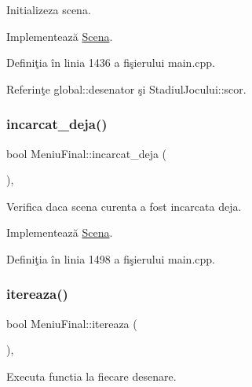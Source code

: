 Initializeza scena. 

Implementează \hyperlink{classScena_a6f53a1dcef68084361dc8f9d56bbb8c0}{Scena}.



Definiţia în linia 1436 a fişierului main.\+cpp.



Referinţe global\+::desenator şi Stadiul\+Jocului\+::scor.

\mbox{\label{classMeniuFinal_a72edd47d4783b321124d7d7af74b9ef8}} 
\subsubsection{\texorpdfstring{incarcat\+\_\+deja()}{incarcat\_deja()}}
{\footnotesize\ttfamily bool Meniu\+Final\+::incarcat\+\_\+deja (\begin{DoxyParamCaption}{ }\end{DoxyParamCaption})\hspace{0.3cm}{\ttfamily [override]}, {\ttfamily [virtual]}}

Verifica daca scena curenta a fost incarcata deja. 

Implementează \hyperlink{classScena_ac8de771024795dffa0e5feb8dba881ff}{Scena}.



Definiţia în linia 1498 a fişierului main.\+cpp.

\mbox{\label{classMeniuFinal_a9ee1a22d9df62f0828961d38e05f8aa4}} 
\subsubsection{\texorpdfstring{itereaza()}{itereaza()}}
{\footnotesize\ttfamily bool Meniu\+Final\+::itereaza (\begin{DoxyParamCaption}\item[{\hyperlink{classStadiulJocului}{Stadiul\+Jocului} \&}]{ }\end{DoxyParamCaption})\hspace{0.3cm}{\ttfamily [override]}, {\ttfamily [virtual]}}



Executa functia la fiecare \textquotesingle{}desenare\textquotesingle{}. 


